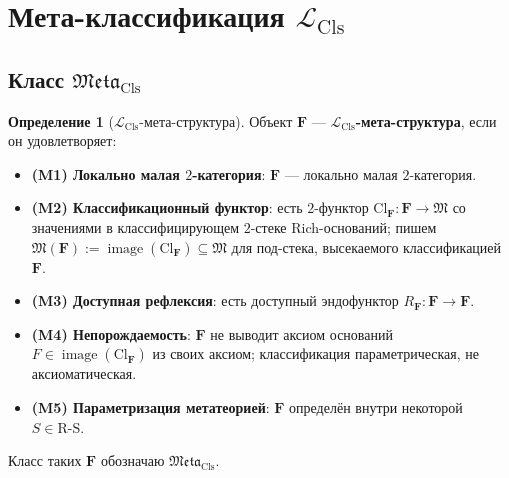 \documentclass[11pt]{article}
\theoremstyle{plain}
\theoremstyle{definition}
\newtheorem{definition}[theorem]{Определение}
\newcommand{\RS}{\mathrm{R\text{-}S}}
\newcommand{\fM}{\mathfrak{M}}
\newcommand{\Meta}{\mathfrak{Meta}}
\newcommand{\LCls}{\mathcal{L}_{\mathrm{Cls}}}
\newcommand{\Cl}{\mathrm{Cl}}
\DeclareMathOperator{\image}{image}
\begin{document}
\section{\texorpdfstring{Мета-классификация $\LCls$}{Мета-классификация классификаторов}}\label{sec:meta}

\subsection{\texorpdfstring{Класс $\Meta_{\mathrm{Cls}}$}{Класс Meta\_Cls}}

\begin{definition}[$\LCls$-мета-структура]\label{def:meta}
Объект $\mathbf{F}$ — \textbf{$\LCls$-мета-структура}, если он удовлетворяет:
\begin{itemize}
\item \textbf{(M1) Локально малая $2$-категория}: $\mathbf{F}$ — локально малая $2$-категория.
\item \textbf{(M2) Классификационный функтор}: есть $2$-функтор $\Cl_{\mathbf{F}} : \mathbf{F} \to \fM$ со значениями в классифицирующем $2$-стеке Rich-оснований; пишем $\fM(\mathbf{F}) := \image(\Cl_{\mathbf{F}}) \subseteq \fM$ для под-стека, высекаемого классификацией $\mathbf{F}$.
\item \textbf{(M3) Доступная рефлексия}: есть доступный эндофунктор $R_{\mathbf{F}} : \mathbf{F} \to \mathbf{F}$.
\item \textbf{(M4) Непорождаемость}: $\mathbf{F}$ не выводит аксиом оснований $F \in \image(\Cl_{\mathbf{F}})$ из своих аксиом; классификация параметрическая, не аксиоматическая.
\item \textbf{(M5) Параметризация метатеорией}: $\mathbf{F}$ определён внутри некоторой $S \in \RS$.
\end{itemize}
Класс таких $\mathbf{F}$ обозначаю $\Meta_{\mathrm{Cls}}$.
\end{definition}
\end{document}
